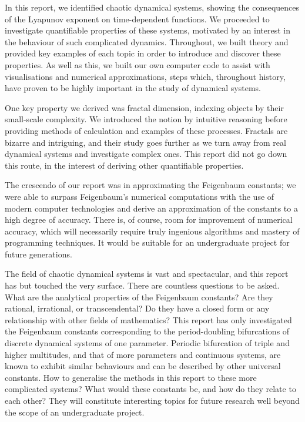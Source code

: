 In this report, we identified chaotic dynamical systems, showing the consequences of the Lyapunov exponent on time-dependent functions. We proceeded to investigate quantifiable properties of these systems, motivated by an interest in the behaviour of such complicated dynamics. Throughout, we built theory and provided key examples of each topic in order to introduce and discover these properties. As well as this, we built our own computer code to assist with visualisations and numerical approximations, steps which, throughout history, have proven to be highly important in the study of dynamical systems. 

One key property we derived was fractal dimension, indexing objects by their small-scale complexity. We introduced the notion by intuitive reasoning before providing methods of calculation and examples of these processes. Fractals are bizarre and intriguing, and their study goes further as we turn away from real dynamical systems and investigate complex ones. This report did not go down this route, in the interest of deriving other quantifiable properties.

The crescendo of our report was in approximating the Feigenbaum constants; we were able to surpass Feigenbaum's numerical computations with the use of modern computer technologies and derive an approximation of the constants to a high degree of accuracy.
There is, of course, room for improvement of numerical accuracy, which will necessarily require truly ingenious algorithms and mastery of programming techniques. 
It would be suitable for an undergraduate project for future generations.

The field of chaotic dynamical systems is vast and spectacular, and this report has but touched the very surface. 
There are countless questions to be asked. 
What are the analytical properties of the Feigenbaum constants? 
Are they rational, irrational, or transcendental? 
Do they have a closed form or any relationship with other fields of mathematics?
This report has only investigated the Feigenbaum constants corresponding to the period-doubling bifurcations of discrete dynamical systems of one parameter. 
Periodic bifurcation of triple and higher multitudes, and that of more parameters and continuous systems, are known to exhibit similar behaviours and can be described by other universal constants. 
How to generalise the methods in this report to these more complicated systems? What would these constants be, and how do they relate to each other?
They will constitute interesting topics for future research well beyond the scope of an undergraduate project.